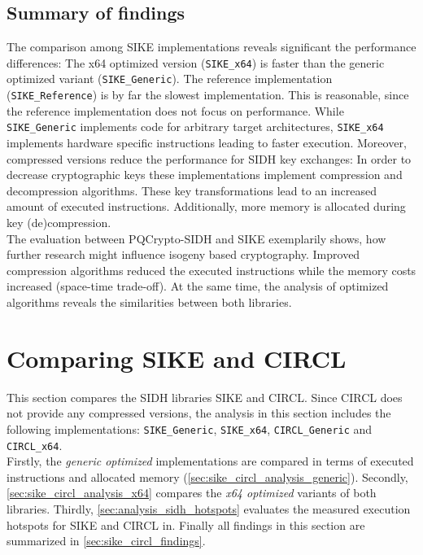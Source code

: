 \subsection{Summary of findings}\label{sec:findings_sike}
The comparison among \gls{SIKE} implementations reveals significant the performance differences: The x64 optimized version (\texttt{SIKE\_x64}) is faster than the generic optimized variant (\texttt{SIKE\_Generic}). The reference implementation (\texttt{SIKE\_Reference}) is by far the slowest implementation. This is reasonable, since the reference implementation does not focus on performance. While \texttt{SIKE\_Generic} implements code for arbitrary target architectures, \texttt{SIKE\_x64} implements hardware specific instructions leading to faster execution.  Moreover, compressed versions reduce the performance for \gls{SIDH} key exchanges: In order to decrease cryptographic keys these implementations implement compression and decompression algorithms. These key transformations lead to an increased amount of executed instructions. Additionally, more memory is allocated during key (de)compression.\\
The evaluation between \gls{PQCrypto-SIDH} and \gls{SIKE} exemplarily shows, how further research might influence isogeny based cryptography. Improved compression algorithms reduced the executed instructions while the memory costs increased (space-time trade-off). At the same time, the analysis of optimized algorithms reveals the similarities between both libraries.


\section{Comparing \gls{SIKE} and \gls{CIRCL}} \label{sec:sike_vs_circl}

This section compares the SIDH libraries \gls{SIKE} and \gls{CIRCL}. Since \gls{CIRCL} does not provide any compressed versions, the analysis in this section includes the following implementations: \texttt{SIKE\_Generic}, \texttt{SIKE\_x64}, \texttt{CIRCL\_Generic} and \texttt{CIRCL\_x64}.\\
Firstly, the \textit{generic optimized} implementations are compared in terms of executed instructions and allocated memory (\autoref{sec:sike_circl_analysis_generic}). Secondly, \autoref{sec:sike_circl_analysis_x64} compares the \textit{x64 optimized} variants of both libraries. Thirdly,  \autoref{sec:analysis_sidh_hotspots} evaluates the measured execution hotspots for \gls{SIKE} and \gls{CIRCL} in. Finally all findings in this section are summarized in \autoref{sec:sike_circl_findings}. 

